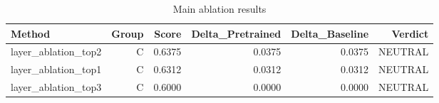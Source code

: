 \begin{table}[htbp]
\centering
\caption{Main ablation results}
\label{tab:main-results}
\begin{tabular}{lrrrrr}
\toprule
\textbf{Method} & \textbf{Group} & \textbf{Score} & \textbf{Delta\_Pretrained} & \textbf{Delta\_Baseline} & \textbf{Verdict} \\
\midrule
layer\_ablation\_top2 & C & 0.6375 & 0.0375 & 0.0375 & NEUTRAL \\
layer\_ablation\_top1 & C & 0.6312 & 0.0312 & 0.0312 & NEUTRAL \\
layer\_ablation\_top3 & C & 0.6000 & 0.0000 & 0.0000 & NEUTRAL \\
\bottomrule
\end{tabular}
\end{table}